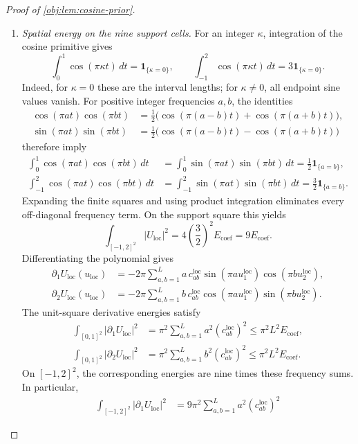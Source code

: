 \begin{proof}[Proof of \cref{obj:lem:cosine-prior}]
\begin{enumerate}
\item \emph{Spatial energy on the nine support cells.}
For an integer \(\kappa\), integration of the cosine primitive gives
\[
\int_0^1\cos(\pi\kappa t)\,dt
=\mathbf1_{\{\kappa=0\}},
\qquad
\int_{-1}^2\cos(\pi\kappa t)\,dt
=3\mathbf1_{\{\kappa=0\}}.
\]
Indeed, for \(\kappa=0\) these are the interval lengths; for
\(\kappa\ne0\), all endpoint sine values vanish. For positive integer
frequencies \(a,b\), the identities
\[
\begin{aligned}
\cos(\pi a t)\cos(\pi b t)
&=\frac12\bigl(\cos(\pi(a-b)t)+\cos(\pi(a+b)t)\bigr),\\
\sin(\pi a t)\sin(\pi b t)
&=\frac12\bigl(\cos(\pi(a-b)t)-\cos(\pi(a+b)t)\bigr)
\end{aligned}
\]
therefore imply
\[
\begin{aligned}
\int_0^1\cos(\pi a t)\cos(\pi b t)\,dt
&=\int_0^1\sin(\pi a t)\sin(\pi b t)\,dt
 =\frac12\mathbf1_{\{a=b\}},\\
\int_{-1}^2\cos(\pi a t)\cos(\pi b t)\,dt
&=\int_{-1}^2\sin(\pi a t)\sin(\pi b t)\,dt
 =\frac32\mathbf1_{\{a=b\}}.
\end{aligned}
\]
Expanding the finite squares and using product integration eliminates
every off-diagonal frequency term. On the support square this yields
\[
\int_{[-1,2]^2}|U_{\mathrm{loc}}|^2
=4\left(\frac32\right)^2 E_{\mathrm{coef}}
=9E_{\mathrm{coef}}.
\]
Differentiating the polynomial gives
\[
\begin{aligned}
\partial_1U_{\mathrm{loc}}(u_{\mathrm{loc}})
&=-2\pi\sum_{a,b=1}^L
 a\,c^{\mathrm{loc}}_{ab}
 \sin(\pi a u_1^{\mathrm{loc}})
 \cos(\pi b u_2^{\mathrm{loc}}),\\
\partial_2U_{\mathrm{loc}}(u_{\mathrm{loc}})
&=-2\pi\sum_{a,b=1}^L
 b\,c^{\mathrm{loc}}_{ab}
 \cos(\pi a u_1^{\mathrm{loc}})
 \sin(\pi b u_2^{\mathrm{loc}}).
\end{aligned}
\]
The unit-square derivative energies satisfy
\[
\begin{aligned}
\int_{[0,1]^2}|\partial_1U_{\mathrm{loc}}|^2
&=\pi^2\sum_{a,b=1}^L a^2(c^{\mathrm{loc}}_{ab})^2
 \leq\pi^2L^2E_{\mathrm{coef}},\\
\int_{[0,1]^2}|\partial_2U_{\mathrm{loc}}|^2
&=\pi^2\sum_{a,b=1}^L b^2(c^{\mathrm{loc}}_{ab})^2
 \leq\pi^2L^2E_{\mathrm{coef}}.
\end{aligned}
\]
On \([-1,2]^2\), the corresponding energies are nine times these
frequency sums. In particular,
\[
\begin{aligned}
\int_{[-1,2]^2}|\partial_1U_{\mathrm{loc}}|^2
&=9\pi^2\sum_{a,b=1}^L a^2(c^{\mathrm{loc}}_{ab})^2

\end{aligned}\]
\end{enumerate}
\end{proof}
